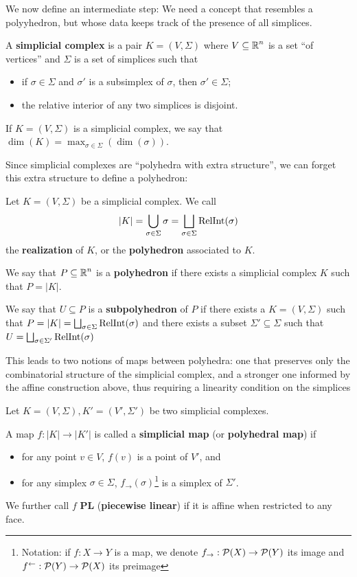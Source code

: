 We now define an intermediate step: We need a concept that resembles a polyyhedron, but whose data 
keeps track of the presence of all simplices.
\begin{definition}
    A \textbf{simplicial complex} is a pair $K=(V,\Sigma)$ where $V\subseteq \operatorname{\mathbb{R}}^n$ is a set ``of vertices'' and $\Sigma$ is a set of simplices such that
    \begin{itemize}
        \item if $\sigma\in \Sigma$ and $\sigma'$ is a subsimplex of $\sigma$, then $\sigma'\in\Sigma$;
        \item the relative interior of any two simplices is disjoint.
    \end{itemize}
    If $K=(V,\Sigma)$ is a simplicial complex, we say that $\dim(K)=\max_{\sigma\in \Sigma}(\dim(\sigma))$.
\end{definition}

Since simplicial complexes are ``polyhedra with extra structure'', we can forget this extra structure to define 
a polyhedron:

\begin{definition}[Polyhedron]\label{Polyhedron}
    Let $K=(V,\Sigma)$ be a simplicial complex. We call
    \[|K|=\bigcup_{\sigma\in\Sigma}\sigma=\bigsqcup_{\sigma\in\Sigma}\operatorname{RelInt}(\sigma)\]
    the \textbf{realization} of $K$, or the \textbf{polyhedron} associated to $K$.

    We say that $P\subseteq \operatorname{\mathbb{R}}^n$ is a \textbf{polyhedron} if there exists a simplicial complex $K$ such that $P=|K|$.

    We say that $U\subseteq P$ is a \textbf{subpolyhedron} of $P$ if there exists a $K=(V,\Sigma)$ such that 
    $P=|K|=\bigsqcup_{\sigma\in\Sigma}\operatorname{RelInt}(\sigma)$ and there exists a subset $\Sigma'\subseteq \Sigma$ such that 
    $U=\bigsqcup_{\sigma\in\Sigma'}\operatorname{RelInt}(\sigma)$
\end{definition}

This leads to two notions of maps between polyhedra: one that preserves only the combinatorial structure of the simplicial complex, 
and a stronger one informed by the affine construction above, thus requiring a linearity condition 
on the simplices

\begin{definition}
    Let $K=(V,\Sigma),K'=(V',\Sigma')$ be two simplicial complexes.

    A map $f:|K|\to|K'|$ is called a \textbf{simplicial map} (or \textbf{polyhedral map}) if
    \begin{itemize}
        \item for any point $v\in V$, $f(v)$ is a point of $V'$, and
        \item for any simplex $\sigma\in\Sigma$, $f_{\to}(\sigma)$\footnote{Notation: if $f:X\to Y$ is a map, we denote $f_\to:\operatorname{\mathcal{P}}(X)\to\operatorname{\mathcal{P}}(Y)$ its image and $f^\gets:\operatorname{\mathcal{P}}(Y)\to\operatorname{\mathcal{P}}(X)$ its preimage} is a simplex of $\Sigma'$.
    \end{itemize}

    We further call $f$ \textbf{PL} (\textbf{piecewise linear}) if it is affine when restricted to any face.
\end{definition}

